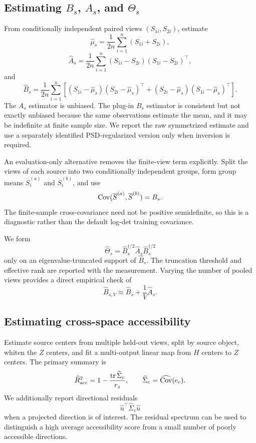 \subsection{Estimating $B_s$, $A_s$, and $\Theta_s$}

From conditionally independent paired views $(S_{1i},S_{2i})$, estimate
\[
\widehat\mu_s
=
\frac1{2n}\sum_{i=1}^n(S_{1i}+S_{2i}),
\]
\[
\widehat A_s
=
\frac1{2n}\sum_{i=1}^n
(S_{1i}-S_{2i})(S_{1i}-S_{2i})^\top,
\]
and
\[
\widehat B_s
=
\frac1{2n}\sum_{i=1}^n
\left[
(S_{1i}-\widehat\mu_s)(S_{2i}-\widehat\mu_s)^\top
+
(S_{2i}-\widehat\mu_s)(S_{1i}-\widehat\mu_s)^\top
\right].
\]
The $A_s$ estimator is unbiased. The plug-in $B_s$ estimator is consistent but
not exactly unbiased because the same observations estimate the mean, and it may
be indefinite at finite sample size. We report the raw symmetrized estimate and
use a separately identified PSD-regularized version only when inversion is
required.

An evaluation-only alternative removes the finite-view term explicitly. Split
the views of each source into two conditionally independent groups, form group
means $\overline S_i^{(a)}$ and $\overline S_i^{(b)}$, and use
\[
\operatorname{Cov}(\overline S^{(a)},\overline S^{(b)})=B_s.
\]
The finite-sample cross-covariance need not be positive semidefinite, so this is
a diagnostic rather than the default log-det training covariance.

We form
\[
\widehat\Theta_s
=
\widehat B_s^{\dagger/2}
\widehat A_s
\widehat B_s^{\dagger/2}
\]
only on an eigenvalue-truncated support of $\widehat B_s$. The truncation
threshold and effective rank are reported with the measurement. Varying the
number of pooled views provides a direct empirical check of
\[
\widehat B_{s,V}
\approx
\widehat B_s+\frac1V\widehat A_s.
\]

\subsection{Estimating cross-space accessibility}

Estimate source centers from multiple held-out views, split by source object,
whiten the $Z$ centers, and fit a multi-output linear map from $H$ centers to
$Z$ centers. The primary summary is
\[
\widehat R^2_{\rm acc}
=
1-\frac{\operatorname{tr}\widehat\Sigma_c}{r_z},
\qquad
\widehat\Sigma_c
=
\widehat{\operatorname{Cov}}(e_c).
\]
We additionally report directional residuals
\[
\widehat u^\top\widehat\Sigma_c\widehat u
\]
when a projected direction is of interest. The residual spectrum can be used to
distinguish a high average accessibility score from a small number of poorly
accessible directions.

